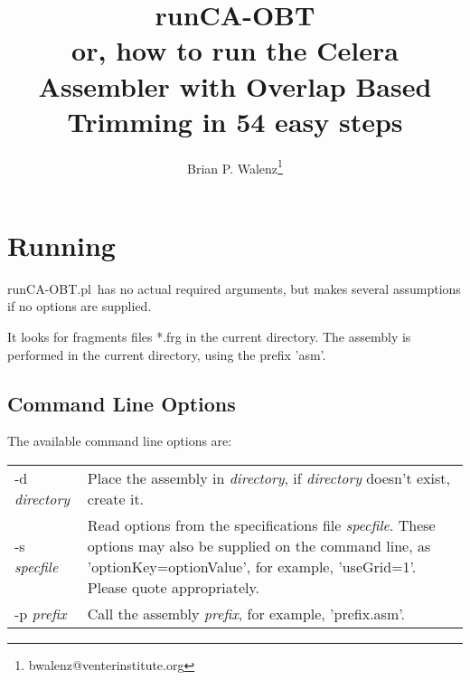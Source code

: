 \documentclass[twoside,11pt]{article}
\begin{document}
\pagestyle{fancy}

\rhead[]{}
\lhead[\today]{\today}

\newcommand{\runCA}{{\sc runCA-OBT.pl}}

\normalem

\title{runCA-OBT\\
{\small or, how to run the Celera Assembler with Overlap Based Trimming in 54 easy steps}}
\author{Brian P. Walenz\thanks{bwalenz@venterinstitute.org}}

\maketitle



\section{Running}

\runCA\ has no actual required arguments, but makes several assumptions
if no options are supplied.

It looks for fragments files *.frg in the current directory.  The
assembly is performed in the current directory, using the prefix
'asm'.

\subsection{Command Line Options}

The available command line options are:


\begin{longtable}{lp{3.0in}}
-d {\it directory} &
Place the assembly in {\it directory}, if {\it directory} doesn't exist,
create it.
\\
-s {\it specfile} &
Read options from the specifications file {\it specfile}.  These options
may also be supplied on the command line, as 'optionKey=optionValue',
for example, 'useGrid=1'.  Please quote appropriately.
\\
-p {\it prefix} &
Call the assembly {\it prefix}, for example, 'prefix.asm'.
\end{longtable}
\end{document}
